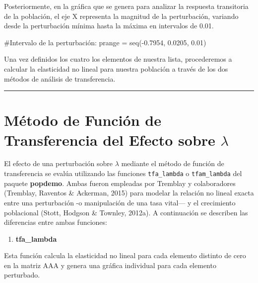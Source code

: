 \documentclass[
  12pt,
  letterpaper,
]{book}
\newenvironment{Shaded}{\begin{snugshade}}{\end{snugshade}}
\newcommand{\CommentTok}[1]{\textcolor[rgb]{0.37,0.37,0.37}{#1}}
\newcommand{\FloatTok}[1]{\textcolor[rgb]{0.68,0.00,0.00}{#1}}
\newcommand{\FunctionTok}[1]{\textcolor[rgb]{0.28,0.35,0.67}{#1}}
\newcommand{\NormalTok}[1]{\textcolor[rgb]{0.00,0.23,0.31}{#1}}
\newcommand{\OtherTok}[1]{\textcolor[rgb]{0.00,0.23,0.31}{#1}}
\newcommand{\SpecialCharTok}[1]{\textcolor[rgb]{0.37,0.37,0.37}{#1}}
\providecommand{\tightlist}{%
  \setlength{\itemsep}{0pt}\setlength{\parskip}{0pt}}\usepackage{longtable,booktabs,array}
\begin{document}
Posteriormente, en la gráfica que se genera para analizar la respuesta
transitoria de la población, el eje X representa la magnitud de la
perturbación, variando desde la perturbación mínima hasta la máxima en
intervalos de 0.01.

\begin{Shaded}
\begin{Highlighting}[]
\CommentTok{\#Intervalo de la perturbación:}
\NormalTok{prange }\OtherTok{=} \FunctionTok{seq}\NormalTok{(}\SpecialCharTok{{-}}\FloatTok{0.7954}\NormalTok{, }\FloatTok{0.0205}\NormalTok{, }\FloatTok{0.01}\NormalTok{)}
\end{Highlighting}
\end{Shaded}

Una vez definidos los cuatro los elementos de nuestra lista,
procederemos a calcular la elasticidad no lineal para nuestra población
a través de los dos métodos de análisis de transferencia.

\begin{center}\rule{0.5\linewidth}{0.5pt}\end{center}

\section{\texorpdfstring{Método de Función de Transferencia del Efecto
sobre
\(\lambda\)}{Método de Función de Transferencia del Efecto sobre \textbackslash lambda}}\label{muxe9todo-de-funciuxf3n-de-transferencia-del-efecto-sobre-lambda}

El efecto de una perturbación sobre \(\lambda\) mediante el método de
función de transferencia se evalúa utilizando las funciones
\texttt{tfa\_lambda} o \texttt{tfam\_lambda} del paquete
\textbf{popdemo}. Ambas fueron empleadas por Tremblay y colaboradores
(Tremblay, Raventos \& Ackerman, 2015) para modelar la relación no
lineal exacta entre una perturbación -o manipulación de una tasa
vital--- y el crecimiento poblacional (Stott, Hodgson \& Townley,
2012a). A continuación se describen las diferencias entre ambas
funciones:

\begin{enumerate}
\def\labelenumi{\alph{enumi})}
\tightlist
\item
  \textbf{tfa\_lambda}
\end{enumerate}

Esta función calcula la elasticidad no lineal para cada elemento
distinto de cero en la matriz AAA y genera una gráfica individual para
cada elemento perturbado.
\end{document}
